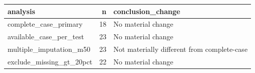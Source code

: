 \begin{tabular}{lrl}
\toprule
analysis & n & conclusion_change \\
\midrule
complete_case_primary & 18 & No material change \\
available_case_per_test & 23 & No material change \\
multiple_imputation_m50 & 23 & Not materially different from complete-case \\
exclude_missing_gt_20pct & 22 & No material change \\
\bottomrule
\end{tabular}
